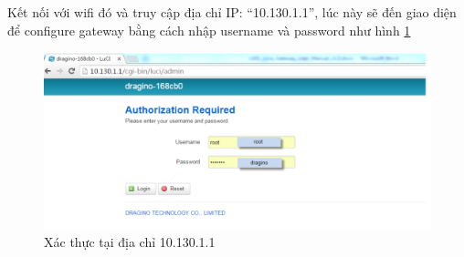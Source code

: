 Kết nối với wifi đó và truy cập địa chỉ IP: “10.130.1.1”, lúc này sẽ đến giao diện để configure gateway bằng cách nhập username và password như hình \ref{fig:gateway_configure}
\begin{figure}[H]
    \includegraphics[width=\textwidth]{images/Quanh/Gateway_configure.png}
    \caption{Xác thực tại địa chỉ 10.130.1.1}
    \label{fig:gateway_configure}
\end{figure}

